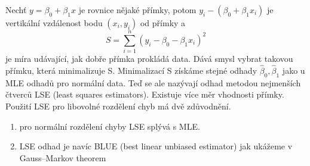 \documentclass[oneside,intlimits,reqno]{scrbook}
\theoremstyle{definition}
\theoremstyle{plain}
\theoremstyle{remark}
\begin{document}
Nechť $ y = \beta_{0} + \beta_{1} x  $ je rovnice nějaké přímky, potom $ y_{i} - (\beta_{0} + \beta_{1} x_{i}) $ je vertikální vzdálenost bodu $ (x_{i},y_{i}) $ od přímky a 
\begin{equation}
 S = \sum_{i=1}^{n} (y_{i} - \beta_{0} - \beta_{1} x_{i})^{2}
\end{equation}
je míra udávající, jak dobře přímka prokládá data. Dává smysl vybrat takovou přímku, která minimalizuje S. Minimalizací S získáme stejné odhady $  \widehat{\beta}_{0}, \widehat{\beta}_{1} $ jako u MLE odhadů pro normální data. Teď se ale nazývají odhad metodou nejmenších čtverců LSE (least squares estimators).
Existuje více měr vhodnosti přímky. Použití LSE pro libovolné rozdělení chyb má dvě zdůvodnění.
\begin{enumerate}
  \item pro normální rozdělení chyby LSE splývá s MLE.
  \item LSE odhad je navíc BLUE (best linear unbiased estimator) jak ukážeme v Gauss–Markov theorem
\end{enumerate}
\end{document}
